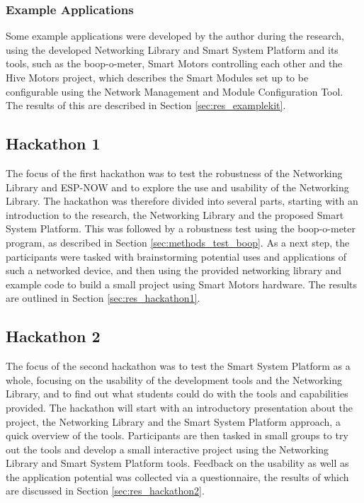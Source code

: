 \subsubsection{\label{sec:methods_example}Example Applications}
Some example applications were developed by the author during the research, using the developed Networking Library and Smart System Platform and its tools, such as the boop-o-meter, Smart Motors controlling each other and the Hive Motors project, which describes the Smart Modules set up to be configurable using the Network Management and Module Configuration Tool. The results of this are described in Section \ref{sec:res_examplekit}.

\subsection{\label{sec:methods_hackathon1}Hackathon 1}

The focus of the first hackathon was to test the robustness of the Networking Library and ESP-NOW and to explore the use and usability of the Networking Library. The hackathon was therefore divided into several parts, starting with an introduction to the research, the Networking Library and the proposed Smart System Platform. This was followed by a robustness test using the boop-o-meter program, as described in Section \ref{sec:methods_test_boop}. As a next step, the participants were tasked with brainstorming potential uses and applications of such a networked device, and then using the provided networking library and example code to build a small project using Smart Motors hardware. The results are outlined in Section \ref{sec:res_hackathon1}.

\subsection{\label{sec:methods_hackathon2}Hackathon 2}

The focus of the second hackathon was to test the Smart System Platform as a whole, focusing on the usability of the development tools and the Networking Library, and to find out what students could do with the tools and capabilities provided. The hackathon will start with an introductory presentation about the project, the Networking Library and the Smart System Platform approach, a quick overview of the tools. Participants are then tasked in small groups to try out the tools and develop a small interactive project using the Networking Library and Smart System Platform tools. Feedback on the usability as well as the application potential was collected via a questionnaire, the results of which are discussed in Section \ref{sec:res_hackathon2}.

